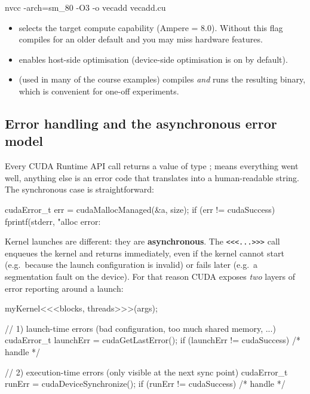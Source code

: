 \begin{codeblock}[language=bash]
nvcc -arch=sm_80 -O3 -o vecadd vecadd.cu
\end{codeblock}

\begin{itemize}
    \item {} selects the target compute capability (Ampere = 8.0). Without this flag  compiles for an older default and you may miss hardware features.
    \item {} enables host-side optimisation (device-side optimisation is on by default).
    \item {} (used in many of the course examples) compiles \emph{and} runs the resulting binary, which is convenient for one-off experiments.
\end{itemize}

\subsection{Error handling and the asynchronous error model}

Every CUDA Runtime API call returns a value of type ;  means everything went well, anything else is an error code that  translates into a human-readable string. The synchronous case is straightforward:

\begin{codeblock}[language=C]
cudaError_t err = cudaMallocManaged(&a, size);
if (err != cudaSuccess)
    fprintf(stderr, "alloc error: %
\end{codeblock}

Kernel launches are different: they are \textbf{asynchronous}. The \texttt{<<<...>>>} call enqueues the kernel and returns immediately, even if the kernel cannot start (e.g.\ because the launch configuration is invalid) or fails later (e.g.\ a segmentation fault on the device). For that reason CUDA exposes \emph{two} layers of error reporting around a launch:

\begin{codeblock}[language=C]
myKernel<<<blocks, threads>>>(args);

// 1) launch-time errors (bad configuration, too much shared memory, ...)
cudaError_t launchErr = cudaGetLastError();
if (launchErr != cudaSuccess) { /* handle */ }

// 2) execution-time errors (only visible at the next sync point)
cudaError_t runErr = cudaDeviceSynchronize();
if (runErr != cudaSuccess) { /* handle */ }
\end{codeblock}

